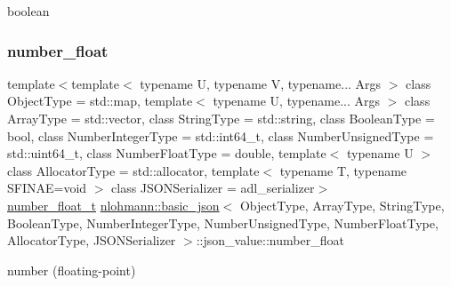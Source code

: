 boolean 

\mbox{\label{unionnlohmann_1_1basic__json_1_1json__value_ad003495e39e78b8096e0b6fc690d146f}} 
\subsubsection{\texorpdfstring{number\+\_\+float}{number\_float}}
{\footnotesize\ttfamily template$<$template$<$ typename U, typename V, typename... Args $>$ class Object\+Type = std\+::map, template$<$ typename U, typename... Args $>$ class Array\+Type = std\+::vector, class String\+Type  = std\+::string, class Boolean\+Type  = bool, class Number\+Integer\+Type  = std\+::int64\+\_\+t, class Number\+Unsigned\+Type  = std\+::uint64\+\_\+t, class Number\+Float\+Type  = double, template$<$ typename U $>$ class Allocator\+Type = std\+::allocator, template$<$ typename T, typename S\+F\+I\+N\+A\+E=void $>$ class J\+S\+O\+N\+Serializer = adl\+\_\+serializer$>$ \\
\hyperlink{classnlohmann_1_1basic__json_a88d6103cb3620410b35200ee8e313d97}{number\+\_\+float\+\_\+t} \hyperlink{classnlohmann_1_1basic__json}{nlohmann\+::basic\+\_\+json}$<$ Object\+Type, Array\+Type, String\+Type, Boolean\+Type, Number\+Integer\+Type, Number\+Unsigned\+Type, Number\+Float\+Type, Allocator\+Type, J\+S\+O\+N\+Serializer $>$\+::json\+\_\+value\+::number\+\_\+float}



number (floating-\/point) 

\mbox{\label{unionnlohmann_1_1basic__json_1_1json__value_afa3c414445aeffb56a7c6926f9420941}} 
